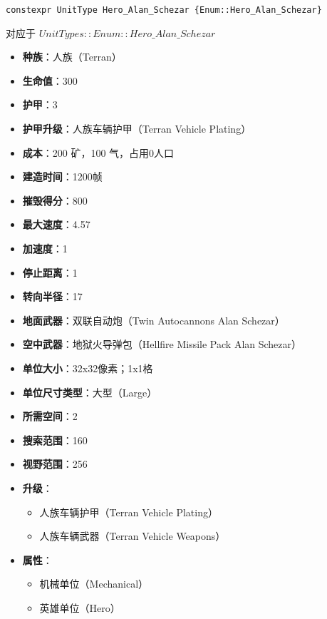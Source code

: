 \begin{tcolorbox}[colback=white, colframe=black!60!white, title=Hero\_Alan\_Schezar(), arc=0mm]
    \begin{verbatim}
constexpr UnitType Hero_Alan_Schezar {Enum::Hero_Alan_Schezar}
    \end{verbatim}
    对应于  $ UnitTypes::Enum::Hero\_Alan\_Schezar $ 
    \begin{itemize}
        \item \textbf{种族}：人族（Terran）
        \item \textbf{生命值}：300
        \item \textbf{护甲}：3
        \item \textbf{护甲升级}：人族车辆护甲（Terran Vehicle Plating）
        \item \textbf{成本}：200 矿，100 气，占用0人口
        \item \textbf{建造时间}：1200帧
        \item \textbf{摧毁得分}：800
        \item \textbf{最大速度}：4.57
        \item \textbf{加速度}：1
        \item \textbf{停止距离}：1
        \item \textbf{转向半径}：17
        \item \textbf{地面武器}：双联自动炮（Twin Autocannons Alan Schezar）
        \item \textbf{空中武器}：地狱火导弹包（Hellfire Missile Pack Alan Schezar）
        \item \textbf{单位大小}：32x32像素；1x1格
        \item \textbf{单位尺寸类型}：大型（Large）
        \item \textbf{所需空间}：2
        \item \textbf{搜索范围}：160
        \item \textbf{视野范围}：256
        \item \textbf{升级}：
            \begin{itemize}
                \item 人族车辆护甲（Terran Vehicle Plating）
                \item 人族车辆武器（Terran Vehicle Weapons）
            \end{itemize}
        \item \textbf{属性}：
            \begin{itemize}
                \item 机械单位（Mechanical）
                \item 英雄单位（Hero）
            \end{itemize}
    \end{itemize}
\end{tcolorbox}

